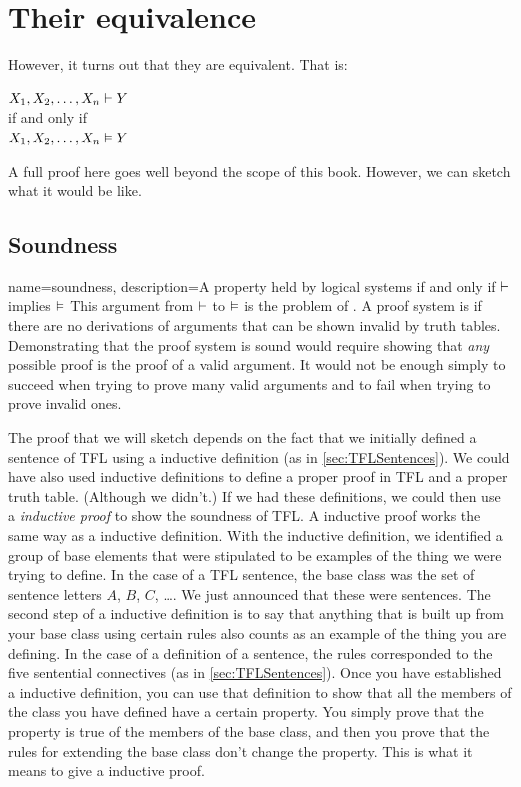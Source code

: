 \section{Their equivalence}
However, it turns out that they are equivalent.
That is:
\begin{center}
$X_1, X_2, \ldots, X_n \vdash Y$\\if and only if\\
$X_1, X_2, \ldots, X_n \vDash Y$
\end{center}
A full proof here goes well beyond the scope of this book. However, we can sketch what it would be like.

\subsection{Soundness}

{
name=soundness,
description={A property held by logical systems if and only if $\vdash $ implies $\vDash $}
}
This argument from $\vdash $ to $\vDash $ is the problem of . \label{def:soundness} A proof system is  if there are no derivations of arguments that can be shown invalid by truth tables. \label{def_Soundness} Demonstrating that the proof system is sound would require showing that \emph{any} possible proof is the proof of a valid argument. It would not be enough simply to succeed when trying to prove many valid arguments and to fail when trying to prove invalid ones.

The proof that we will sketch depends on the fact that we initially defined a sentence of TFL using a inductive definition (as in \cref{sec:TFLSentences}). We could have also used inductive definitions to define a proper proof in TFL and a proper truth table. (Although we didn't.) If we had these definitions, we could then use a \emph{inductive proof} to show the soundness of TFL. A inductive proof works the same way as a inductive definition. With the inductive definition, we identified a group of base elements that were stipulated to be examples of the thing we were trying to define. In the case of a TFL sentence, the base class was the set of sentence letters $A$, $B$, $C$, \dots. We just announced that these were sentences. The second step of a inductive definition is to say that anything that is built up from your base class using certain rules also counts as an example of the thing you are defining. In the case of a definition of a sentence, the rules corresponded to the five sentential connectives (as in \cref{sec:TFLSentences}). Once you have established a inductive definition, you can use that definition to show that all the members of the class you have defined have a certain property. You simply prove that the property is true of the members of the base class, and then you prove that the rules for extending the base class don't change the property. This is what it means to give a inductive proof.

